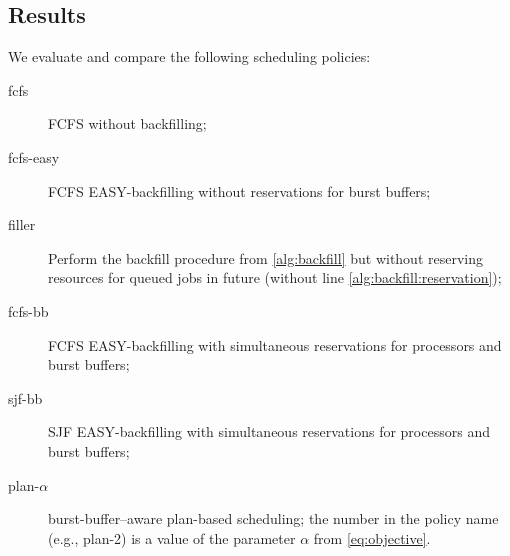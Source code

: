 \documentclass[runningheads]{llncs}
\begin{document}
\subsection{Results} \label{sec:results}
We evaluate and compare the following scheduling policies:
\begin{description}
\item[fcfs] FCFS without backfilling;
\item[fcfs-easy] FCFS EASY-backfilling without reservations for burst buffers;
\item[filler] Perform the backfill procedure from \cref{alg:backfill} but without reserving resources for queued jobs in future (without line \ref{alg:backfill:reservation});
\item[fcfs-bb] FCFS EASY-backfilling with simultaneous reservations for processors and burst buffers;
\item[sjf-bb] SJF EASY-backfilling with simultaneous reservations for processors and burst buffers;
\item[plan-$\alpha$] burst-buffer--aware plan-based scheduling; the number in the policy name (e.g., plan-2) is a value of the parameter $\alpha$ from \cref{eq:objective}.
\end{description}
\end{document}
